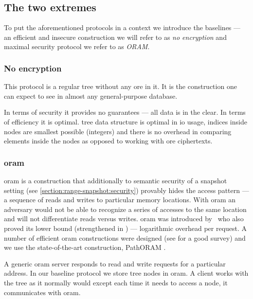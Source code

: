 \subsection{The two extremes}

	To put the aforementioned protocols in a context we introduce the baselines --- an efficient and insecure construction we will refer to as \emph{no encryption} and maximal security protocol we refer to as \emph{ORAM}.

	\subsubsection{No encryption}

		This protocol is a regular {\BPlus} tree \cite{b-tree} without any \acrshort{ore} in it.
		It is the construction one can expect to see in almost any general-purpose database.

		In terms of security it provides no guarantees --- all data is in the clear.
		In terms of efficiency it is optimal.
		{\BPlus} tree data structure is optimal in \acrshort{io} usage, indices inside nodes are smallest possible (integers) and there is no overhead in comparing elements inside the nodes as opposed to working with \acrshort{ore} ciphertexts.

	\subsubsection{\acrshort{oram}}\label{section:range-snapshot:oram}

		\acrfull{oram} is a construction that additionally to semantic security of a snapshot setting (see \cref{section:range-snapshot:security}) provably hides the access pattern --- a sequence of reads and writes to particular memory locations.
		With \acrshort{oram} an adversary would not be able to recognize a series of accesses to the same location and will not differentiate reads versus writes.
		\acrshort{oram} was introduced by~\textcite{oram-original} who also proved its lower bound (strengthened in \cite{oram-tighter-lower-bound}) --- logarithmic overhead per request.
		A number of efficient \acrshort{oram} constructions were designed (see \cite{oram-survey-feifei} for a good survey) and we use the state-of-the-art construction, PathORAM \cite{path-oram}.

		A generic \acrshort{oram} server responds to read and write requests for a particular address.
		In our baseline protocol we store {\BPlus} tree nodes in \acrshort{oram}.
		A client works with the tree as it normally would except each time it needs to access a node, it communicates with \acrshort{oram}.

